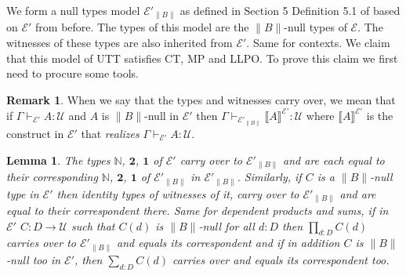 \documentclass[12pt]{report}
\newtheorem{lem}[thm]{Lemma}
\theoremstyle{definition}
\newtheorem{rem}[thm]{Remark}
\begin{document}
We form a null types model $\mathcal{E}'_{\lVert B \rVert}$ as defined in Section 5 Definition 5.1 of \cite{1905.03014} based on $\mathcal{E}'$ from before. 
The types of this model are the $\lVert B \rVert $-null types of $\mathcal{E}$. 
The witnesses of these types are also inherited from $\mathcal{E}'$. 
Same for contexts. 
We claim that this model of UTT satisfies CT, MP and LLPO. 
To prove this claim we first need to procure some tools. 
\begin{rem}
When we say that the types and witnesses carry over, we mean that if $\Gamma \vdash_{\mathcal{E}'} A : \mathcal{U}$ and $A$ is $\lVert B \rVert$-null in $\mathcal{E}'$ then $\Gamma \vdash_{\mathcal{E}'_{\lVert B \rVert}} \llbracket A\rrbracket^{\mathcal{E}'} : \mathcal{U}$ where $\llbracket A\rrbracket^{\mathcal{E}'}$ is the construct in $\mathcal{E}'$ that \textit{realizes} $\Gamma \vdash_{\mathcal{E}'} A : \mathcal{U}$.  
\end{rem}
\begin{lem}\label{wellPurported}
The types $\mathbb{N}$, $\mathbf{2}$, $\mathbf{1}$ of $\mathcal{E}'$ carry over to $\mathcal{E}'_{\lVert B \rVert}$ and are each equal to their corresponding $\mathbb{N}$, $\mathbf{2}$, $\mathbf{1}$ of $\mathcal{E}'_{\lVert B \rVert}$ in $\mathcal{E}'_{\lVert B \rVert}$. 
Similarly, if $C$ is a $\lVert B \rVert$-null type in $\mathcal{E}'$ then identity types of witnesses of it, carry over to $\mathcal{E}'_{\lVert B \rVert}$ and are equal to their correspondent there. 
Same for dependent products and sums, if in $\mathcal{E}'$ $C : D \rightarrow \mathcal{U}$ such that $C(d)$ is $\lVert B \rVert$-null for all $d : D$ then $\prod_{d:D}C(d)$ carries over to $\mathcal{E}'_{\lVert B \rVert}$ and equals its correspondent and if in addition $C$ is $\lVert B \rVert$-null too in $\mathcal{E}'$, then $\sum_{d:D} C(d)$ carries over and equals its correspondent too. 
\end{lem}
\end{document}
